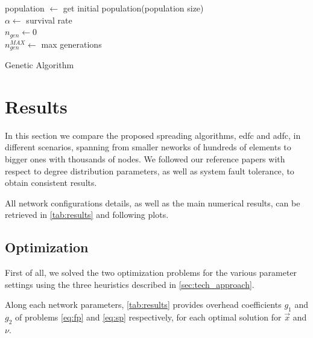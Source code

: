 \documentclass[12pt,journal,draftclsnofoot,onecolumn]{IEEEtran}
\DeclarePairedDelimiter\floor{\lfloor}{\rfloor}
\begin{document}
\begin{algorithm}
	population $\gets$ get initial population(population size) \\
	$\alpha \gets$ survival rate \\
	$n_{gen} \gets 0$ \\
	$n_{gen}^{MAX} \gets$ max generations \\
	\caption{Genetic Algorithm}\label{algo:GA}
\end{algorithm}

\clearpage
\section{Results} \label{sec:results}
In this section we compare the proposed spreading algorithms, \gls{edfc} and \gls{adfc}, in different scenarios, spanning from smaller neworks of hundreds of elements to bigger ones with thousands of nodes.
We followed our reference papers \cite{Lin2007} \cite{Aly2008} with respect to degree distribution parameters, as well as system fault tolerance, to obtain consistent results.

All network configurations details, as well as the main numerical results, can be retrieved in \autoref{tab:results} and following plots.

\subsection{Optimization}
First of all, we solved the two optimization problems for the various parameter settings using the three heuristics described in \autoref{sec:tech_approach}.

Along each network parameters, \autoref{tab:results} provides overhead coefficients $g_1$ and $g_2$ of problems \autoref{eq:fp} and \autoref{eq:sp} respectively, for each optimal solution for $\vec{x}$ and $\nu$.\cite{Lin2007}
\end{document}
